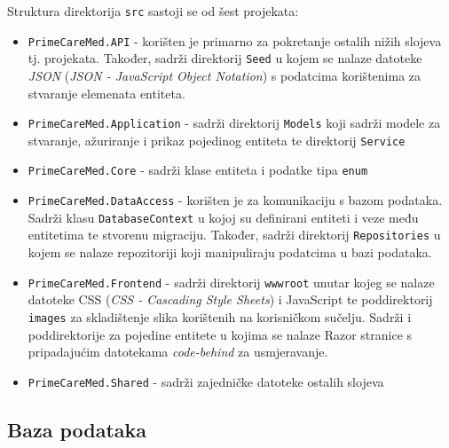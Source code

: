 Struktura direktorija \texttt{src} sastoji se od šest projekata: \\
\begin{itemize}
\item \texttt{PrimeCareMed.API} - korišten je primarno za pokretanje ostalih nižih slojeva tj. projekata. Također, sadrži direktorij \texttt{Seed} u kojem se nalaze datoteke \textit{JSON} (\textit{JSON - JavaScript Object Notation}) s podatcima korištenima za stvaranje elemenata entiteta.

\item \texttt{PrimeCareMed.Application} - sadrži direktorij \texttt{Models} koji sadrži modele za stvaranje, ažuriranje i prikaz pojedinog entiteta te direktorij \texttt{Service}

\item \texttt{PrimeCareMed.Core} - sadrži klase entiteta i podatke tipa \texttt{enum}

\item \texttt{PrimeCareMed.DataAccess} - korišten je za komunikaciju s bazom podataka. Sadrži klasu \texttt{DatabaseContext} u kojoj su definirani entiteti i veze među entitetima te stvorenu migraciju. Također, sadrži direktorij \texttt{Repositories} u kojem se nalaze repozitoriji koji manipuliraju podatcima u bazi podataka.

\item \texttt{PrimeCareMed.Frontend} - sadrži direktorij \texttt{wwwroot} unutar kojeg se nalaze datoteke CSS (\textit{CSS - Cascading Style Sheets}) i JavaScript te poddirektorij \texttt{images} za skladištenje slika korištenih na korisničkom sučelju. Sadrži i poddirektorije za pojedine entitete u kojima se nalaze Razor stranice s pripadajućim datotekama \textit{code-behind} za usmjeravanje.

\item \texttt{PrimeCareMed.Shared} - sadrži zajedničke datoteke ostalih slojeva
\end{itemize}

\subsection{Baza podataka}
